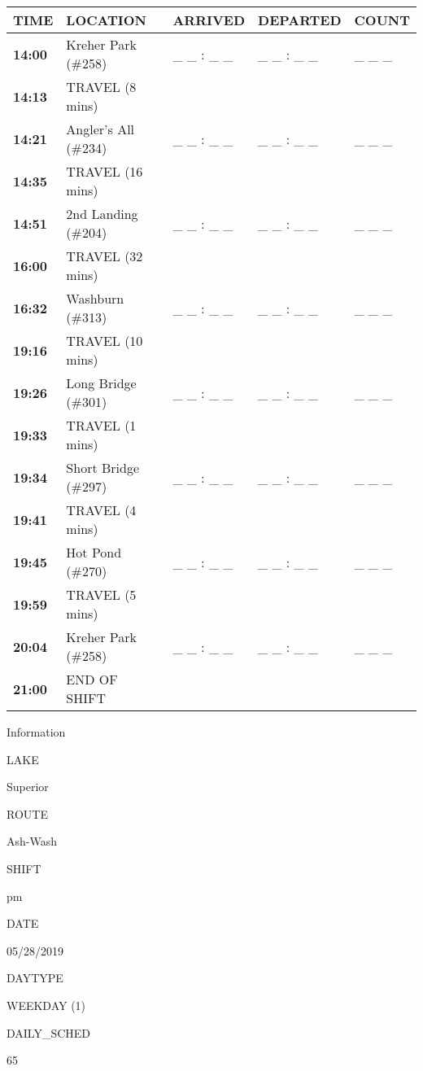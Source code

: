 \documentclass[]{article}
\begin{document}
\begin{tabular}{>{\bfseries}lllll}
\toprule
\textbf{TIME} & \textbf{LOCATION} & \textbf{ARRIVED} & \textbf{DEPARTED} & \textbf{COUNT}\\
\midrule
14:00 & Kreher Park (\#258) & \_ \_ : \_ \_ & \_ \_ : \_ \_ & \_ \_ \_\\
14:13 & TRAVEL (8 mins) &  &  & \\
14:21 & Angler's All (\#234) & \_ \_ : \_ \_ & \_ \_ : \_ \_ & \_ \_ \_\\
14:35 & TRAVEL (16 mins) &  &  & \\
14:51 & 2nd Landing (\#204) & \_ \_ : \_ \_ & \_ \_ : \_ \_ & \_ \_ \_\\
16:00 & TRAVEL (32 mins) &  &  & \\
16:32 & Washburn (\#313) & \_ \_ : \_ \_ & \_ \_ : \_ \_ & \_ \_ \_\\
19:16 & TRAVEL (10 mins) &  &  & \\
19:26 & Long Bridge (\#301) & \_ \_ : \_ \_ & \_ \_ : \_ \_ & \_ \_ \_\\
19:33 & TRAVEL (1 mins) &  &  & \\
19:34 & Short Bridge (\#297) & \_ \_ : \_ \_ & \_ \_ : \_ \_ & \_ \_ \_\\
19:41 & TRAVEL (4 mins) &  &  & \\
19:45 & Hot Pond (\#270) & \_ \_ : \_ \_ & \_ \_ : \_ \_ & \_ \_ \_\\
19:59 & TRAVEL (5 mins) &  &  & \\
20:04 & Kreher Park (\#258) & \_ \_ : \_ \_ & \_ \_ : \_ \_ & \_ \_ \_\\
21:00 & END OF SHIFT &  &  & \\
\bottomrule
\end{tabular}\newpage

Information

LAKE

Superior

ROUTE

Ash-Wash

SHIFT

pm

DATE

05/28/2019

DAYTYPE

WEEKDAY (1)

DAILY\_SCHED

65

\vspace{24pt}
\end{document}
